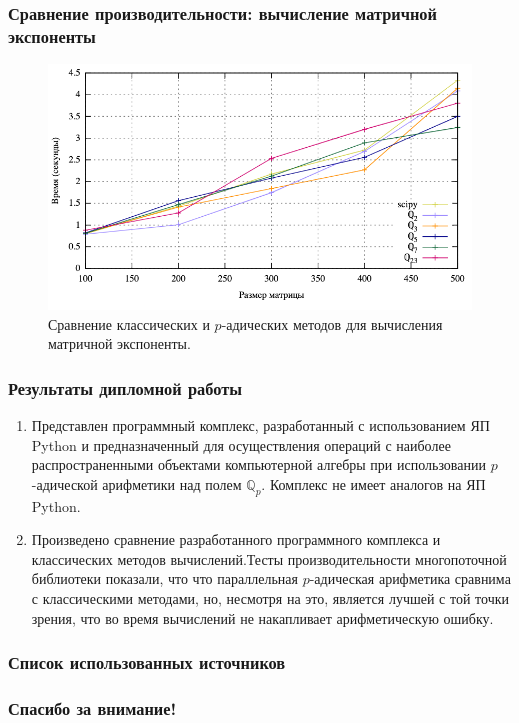 \documentclass[10pt,professionalfont,utf8,presentation,compress]{beamer}
\theoremstyle{definition}
\theoremstyle{plain}
\begin{document}
\begin{frame}
\frametitle{Сравнение производительности: вычисление матричной экспоненты}
\begin{figure}[H]
\centerline{\includegraphics[width=0.95\linewidth]{../gnuplot/exp/plotfix.png}}
\caption{Сравнение классических и $p$-адических методов для вычисления матричной экспоненты.}
\label{img:exp:plot}
\end{figure}
\end{frame}


\begin{frame}
    \frametitle{Результаты дипломной работы}
    \begin{enumerate}
        \item Представлен программный комплекс, разработанный с использованием ЯП Python и предназначенный для осуществления операций с наиболее распространенными объектами компьютерной алгебры при использовании $p$-адической арифметики над полем $\mathbb{Q}_p$. Комплекс не имеет аналогов на ЯП Python.
        \item Произведено сравнение разработанного программного комплекса и классических методов вычислений.Тесты производительности многопоточной библиотеки показали, что что параллельная $p$-адическая арифметика сравнима с классическими методами, но, несмотря на это, является лучшей с той точки зрения, что во время вычислений не накапливает арифметическую ошибку.
    \end{enumerate}    
\end{frame}

\begin{frame}[allowframebreaks]
\frametitle{Список использованных источников}
\nocite{*}


\end{frame}


\begin{frame}[c]
\begin{center}
\frametitle{\LARGE Спасибо за внимание!}

{\LARGE \inserttitle}

\bigskip\bigskip

{\large \insertauthor}

\bigskip\bigskip

{\insertinstitute}

\bigskip\bigskip

{\large \insertdate}
\end{center}
\end{frame}
\end{document}
